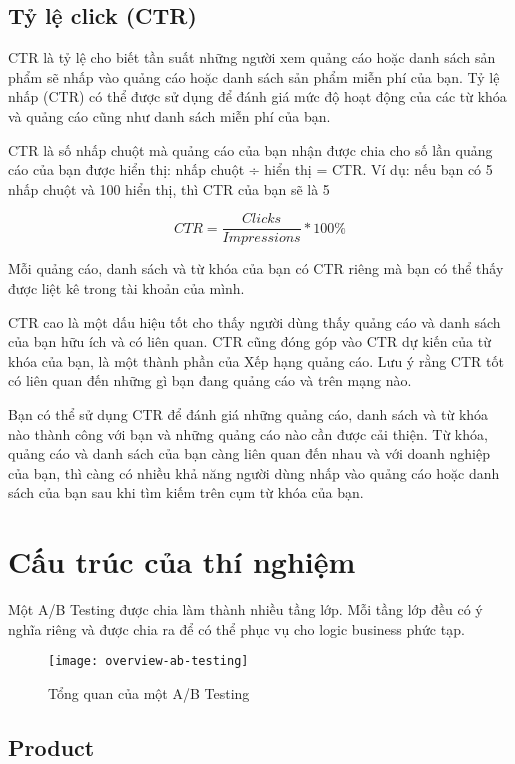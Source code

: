 \subsection{Tỷ lệ click (CTR)}

CTR là tỷ lệ cho biết tần suất những người xem quảng cáo hoặc danh sách sản phẩm sẽ nhấp vào quảng cáo hoặc danh sách sản phẩm miễn phí của bạn. Tỷ lệ nhấp (CTR) có thể được sử dụng để đánh giá mức độ hoạt động của các từ khóa và quảng cáo cũng như danh sách miễn phí của bạn.

CTR là số nhấp chuột mà quảng cáo của bạn nhận được chia cho số lần quảng cáo của bạn được hiển thị: nhấp chuột ÷ hiển thị = CTR. Ví dụ: nếu bạn có 5 nhấp chuột và 100 hiển thị, thì CTR của bạn sẽ là 5%

\begin{displaymath}
	CTR = \frac{Clicks}{Impressions} * 100\%
\end{displaymath}

Mỗi quảng cáo, danh sách và từ khóa của bạn có CTR riêng mà bạn có thể thấy được liệt kê trong tài khoản của mình.

CTR cao là một dấu hiệu tốt cho thấy người dùng thấy quảng cáo và danh sách của bạn hữu ích và có liên quan. CTR cũng đóng góp vào CTR dự kiến của từ khóa của bạn, là một thành phần của Xếp hạng quảng cáo. Lưu ý rằng CTR tốt có liên quan đến những gì bạn đang quảng cáo và trên mạng nào.

Bạn có thể sử dụng CTR để đánh giá những quảng cáo, danh sách và từ khóa nào thành công với bạn và những quảng cáo nào cần được cải thiện. Từ khóa, quảng cáo và danh sách của bạn càng liên quan đến nhau và với doanh nghiệp của bạn, thì càng có nhiều khả năng người dùng nhấp vào quảng cáo hoặc danh sách của bạn sau khi tìm kiếm trên cụm từ khóa của bạn.

\section{Cấu trúc của thí nghiệm}

Một A/B Testing được chia làm thành nhiều tầng lớp.
Mỗi tầng lớp đều có ý nghĩa riêng và được chia ra để có thể phục vụ cho logic business phức tạp.

\begin{figure}[ht]
	\centering
	\texttt{[image: overview-ab-testing]}
	\caption{Tổng quan của một A/B Testing}
\end{figure}

\subsection{Product}

